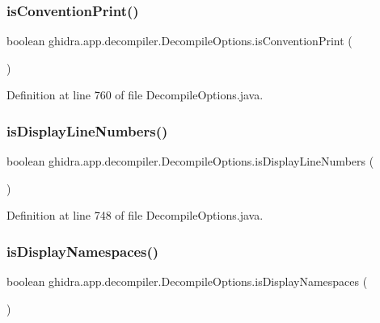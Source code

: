\subsubsection{\texorpdfstring{isConventionPrint()}{isConventionPrint()}}
{\footnotesize\ttfamily boolean ghidra.\+app.\+decompiler.\+Decompile\+Options.\+is\+Convention\+Print (\begin{DoxyParamCaption}{ }\end{DoxyParamCaption})\hspace{0.3cm}{\ttfamily [inline]}}



Definition at line 760 of file Decompile\+Options.\+java.

\mbox{\label{classghidra_1_1app_1_1decompiler_1_1_decompile_options_aaf7cdc35f70a35bad852ade5ab40a0d7}} 
\subsubsection{\texorpdfstring{isDisplayLineNumbers()}{isDisplayLineNumbers()}}
{\footnotesize\ttfamily boolean ghidra.\+app.\+decompiler.\+Decompile\+Options.\+is\+Display\+Line\+Numbers (\begin{DoxyParamCaption}{ }\end{DoxyParamCaption})\hspace{0.3cm}{\ttfamily [inline]}}



Definition at line 748 of file Decompile\+Options.\+java.

\mbox{\label{classghidra_1_1app_1_1decompiler_1_1_decompile_options_a12283b5df1965867ba288f1ba6241a6f}} 
\subsubsection{\texorpdfstring{isDisplayNamespaces()}{isDisplayNamespaces()}}
{\footnotesize\ttfamily boolean ghidra.\+app.\+decompiler.\+Decompile\+Options.\+is\+Display\+Namespaces (\begin{DoxyParamCaption}{ }\end{DoxyParamCaption})\hspace{0.3cm}{\ttfamily [inline]}}



